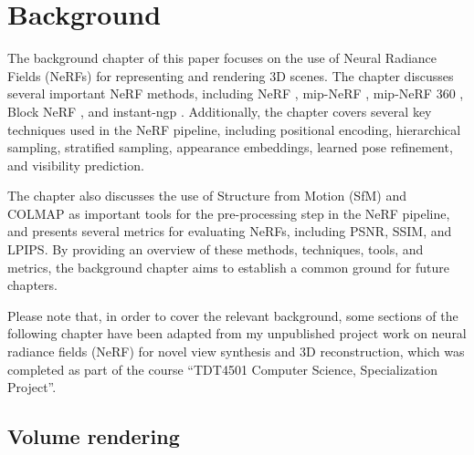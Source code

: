 \chapter{Background} \label{chap:relatedwork}

The background chapter of this paper focuses on the use of Neural Radiance Fields (NeRFs) for representing and rendering 3D scenes. The chapter discusses several important NeRF methods, including NeRF \cite{mildenhall_nerf_2020}, mip-NeRF \cite{barron_mip-nerf_2021}, mip-NeRF 360 \cite{barron_mip-nerf_2022}, Block NeRF \cite{tancik_block-nerf_2022}, and instant-ngp \cite{muller_instant_2022}. Additionally, the chapter covers several key techniques used in the NeRF pipeline, including positional encoding, hierarchical sampling, stratified sampling, appearance embeddings, learned pose refinement, and visibility prediction.

The chapter also discusses the use of Structure from Motion (SfM) and COLMAP \cite{schoenberger2016sfm} as important tools for the pre-processing step in the NeRF pipeline, and presents several metrics for evaluating NeRFs, including PSNR, SSIM, and LPIPS. By providing an overview of these methods, techniques, tools, and metrics, the background chapter aims to establish a common ground for future chapters. 

Please note that, in order to cover the relevant background, some sections of the following chapter have been adapted from my unpublished project work on neural radiance fields (NeRF) for novel view synthesis and 3D reconstruction, which was completed as part of the course “TDT4501 Computer Science, Specialization Project”.

\section{Volume rendering} \label{sec:volumerendering}

